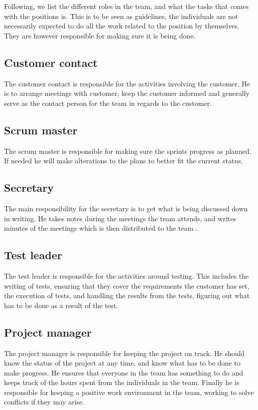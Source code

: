 \documentclass[11pt]{book}
\begin{document}
Following, we list the different roles in the team, and what the tasks that comes with the positions is. This is to be seen as guidelines, the individuals are not necessarily expected to do all the work related to the position by themselves. They are however responsible for making sure it is being done.

\subsection{Customer contact}
The customer contact is responsible for the activities involving the customer. He is to arrange meetings with customer, keep the customer informed and generally serve as the contact person for the team in regards to the customer.

\subsection{Scrum master}
The scrum master is responsible for making sure the sprints progress as planned. If needed he will make alterations to the plans to better fit the current status.

\subsection{Secretary}
The main responsibility for the secretary is to get what is being discussed down in writing. He takes notes during the meetings the team attends, and writes minutes of the meetings which is then distributed to the team .

\subsection{Test leader}
The test leader is responsible for the activities around testing. This includes the writing of tests, ensuring that they cover the requirements the customer has set, the execution of tests, and handling the results from the tests, figuring out what has to be done as a result of the test.

\subsection{Project manager}
The project manager is responsible for keeping the project on track. He should know the status of the project at any time, and know what has to be done to make progress. He ensures that everyone in the team has something to do and keeps track of the hours spent from the individuals in the team. Finally he is responsible for keeping a positive work environment in the team, working to solve conflicts if they may arise.
\end{document}
